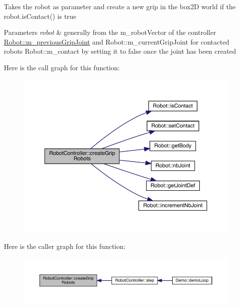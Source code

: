 Takes the robot as parameter and create a new grip in the box2D world if the robot.\+is\+Contact() is true 
\begin{DoxyParams}{Parameters}
{\em robot} & generally from the m\+\_\+robot\+Vector of the controller  \mbox{\hyperlink{class_robot_a35d0d222246bd7084fac5ae5cdf6d3ce}{Robot\+::m\+\_\+previous\+Grip\+Joint}} and Robot\+::m\+\_\+current\+Grip\+Joint for contacted robots  Robot\+::m\+\_\+contact by setting it to false once the joint has been created \\
\hline
\end{DoxyParams}
Here is the call graph for this function\+:\nopagebreak
\begin{figure}[H]
\begin{center}
\leavevmode
\includegraphics[width=350pt]{class_robot_controller_a6b0bdb7620acbf40f48426e30ff0b759_cgraph}
\end{center}
\end{figure}
Here is the caller graph for this function\+:\nopagebreak
\begin{figure}[H]
\begin{center}
\leavevmode
\includegraphics[width=350pt]{class_robot_controller_a6b0bdb7620acbf40f48426e30ff0b759_icgraph}
\end{center}
\end{figure}
\mbox{\label{class_robot_controller_ad79af125e28750338e0da1fb35d0b72d}} 
